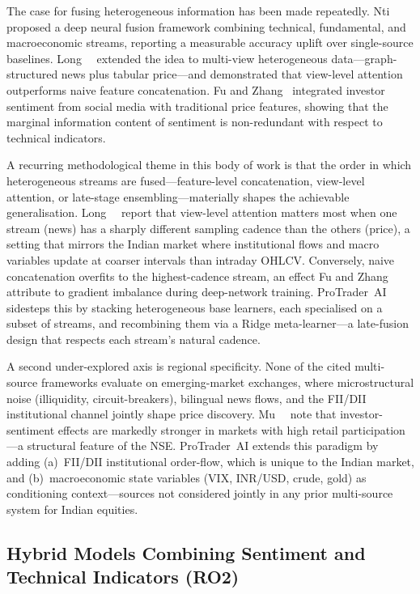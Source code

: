The case for fusing heterogeneous information has been made repeatedly.
Nti~\etal~\cite{nti2021multisource} proposed a deep neural fusion framework
combining technical, fundamental, and macroeconomic streams, reporting a
measurable accuracy uplift over single-source baselines.
Long~\etal~\cite{long2024hybrid} extended the idea to multi-view heterogeneous
data---graph-structured news plus tabular price---and demonstrated that view-level
attention outperforms naive feature concatenation.
Fu and Zhang~\cite{fu2024multisource} integrated investor sentiment from social
media with traditional price features, showing that the marginal information
content of sentiment is non-redundant with respect to technical indicators.

A recurring methodological theme in this body of work is that the order in
which heterogeneous streams are fused---feature-level concatenation, view-level
attention, or late-stage ensembling---materially shapes the achievable
generalisation. Long~\etal~\cite{long2024hybrid} report that view-level attention
matters most when one stream (news) has a sharply different sampling cadence
than the others (price), a setting that mirrors the Indian market where
institutional flows and macro variables update at coarser intervals than
intraday OHLCV. Conversely, naive concatenation overfits to the highest-cadence
stream, an effect Fu and Zhang~\cite{fu2024multisource} attribute to gradient
imbalance during deep-network training. ProTrader~AI sidesteps this by stacking
heterogeneous base learners, each specialised on a subset of streams, and
recombining them via a Ridge meta-learner---a late-fusion design that respects
each stream's natural cadence.

A second under-explored axis is regional specificity. None of the cited
multi-source frameworks evaluate on emerging-market exchanges, where
microstructural noise (illiquidity, circuit-breakers), bilingual news flows,
and the FII/DII institutional channel jointly shape price discovery. Mu~\etal~\cite{mu2023investor}
note that investor-sentiment effects are markedly stronger in markets with
high retail participation---a structural feature of the NSE. ProTrader~AI
extends this paradigm by adding (a)~FII/DII institutional order-flow,
which is unique to the Indian market, and (b)~macroeconomic state variables
(VIX, INR/USD, crude, gold) as conditioning context---sources not considered
jointly in any prior multi-source system for Indian equities.

\subsection{Hybrid Models Combining Sentiment and Technical Indicators (RO2)}

